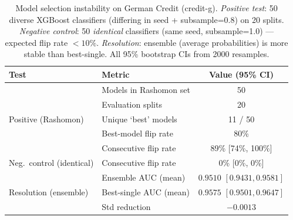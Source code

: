 \begin{table}[ht]
\centering
\caption{Model selection instability on German Credit (credit-g).
  \emph{Positive test}: 50 diverse XGBoost classifiers (differing in seed + subsample=0.8) on 20 splits.
  \emph{Negative control}: 50 \emph{identical} classifiers (same seed, subsample=1.0) --- expected flip rate $<10\%$.
  \emph{Resolution}: ensemble (average probabilities) is more stable than best-single.
  All 95\% bootstrap CIs from 2000 resamples.}
\label{tab:model_selection_instability}
\begin{tabular}{llc}
\toprule
\textbf{Test} & \textbf{Metric} & \textbf{Value (95\% CI)} \\
\midrule
\multirow{5}{*}{Positive (Rashomon)} & Models in Rashomon set & 50 \\
& Evaluation splits & 20 \\
& Unique `best' models & 11 / 50 \\
& Best-model flip rate & 80\% \\
& Consecutive flip rate & 89\% [74\%, 100\%] \\
\midrule
Neg.\ control (identical) & Consecutive flip rate & 0\% [0\%, 0\%] \\
\midrule
\multirow{3}{*}{Resolution (ensemble)} & Ensemble AUC (mean) & $0.9510$ $[0.9431, 0.9581]$ \\
& Best-single AUC (mean) & $0.9575$ $[0.9501, 0.9647]$ \\
& Std reduction & $-0.0013$ \\
\bottomrule
\end{tabular}
\end{table}
